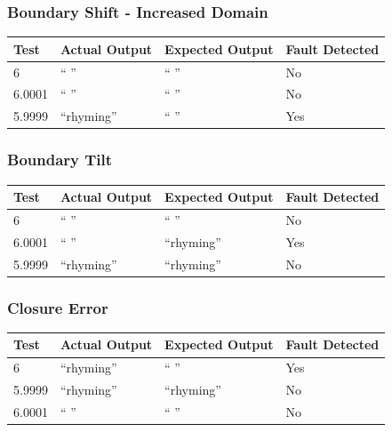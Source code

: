 \documentclass[11pt, oneside]{article}   	%
\begin{document}
\subsubsection{Boundary Shift - Increased Domain}
\begin{table}[!htb]
\centering
\begin{tabular}{|l|l|l|l|}
\hline
Test   & Actual Output & Expected Output & Fault Detected \\ \hline
6      & “ ”           & “ ”             & No             \\ \hline
6.0001 & “ ”           & “ ”             & No             \\ \hline
5.9999 & “rhyming”     & “ ”             & Yes            \\ \hline
\end{tabular}
\end{table}

\subsubsection{Boundary Tilt}
\begin{table}[!htb]
\centering
\begin{tabular}{|l|l|l|l|}
\hline
Test   & Actual Output & Expected Output & Fault Detected \\ \hline
6      & “ ”           & “ ”             & No             \\ \hline
6.0001 & “ ”           & “rhyming”       & Yes            \\ \hline
5.9999 & “rhyming”     & “rhyming”       & No             \\ \hline
\end{tabular}
\end{table}

\subsubsection{Closure Error}
\begin{table}[!htb]
\centering
\begin{tabular}{|l|l|l|l|}
\hline
Test   & Actual Output & Expected Output & Fault Detected \\ \hline
6      & “rhyming”     & “ ”             & Yes            \\ \hline
5.9999 & “rhyming”     & “rhyming”       & No             \\ \hline
6.0001 & “ ”           & “ ”             & No             \\ \hline
\end{tabular}
\end{table}
\newpage
\end{document}
